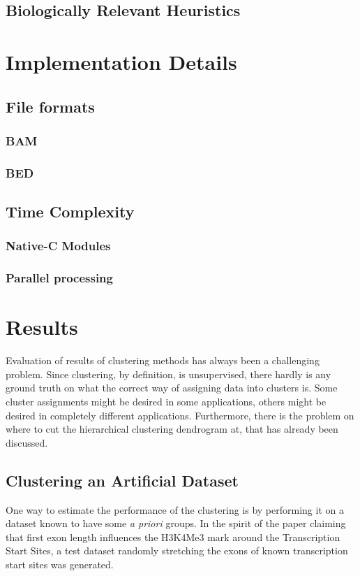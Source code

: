 \documentclass[parskip]{cs4rep}
\begin{document}
\section{Biologically Relevant Heuristics}

\chapter{Implementation Details}

\section{File formats}
\subsection{BAM}
\subsection{BED}
  
\section{Time Complexity}
\subsection{Native-C Modules}
\subsection{Parallel processing}

\chapter{Results}
Evaluation of results of clustering methods has always been a challenging problem. Since clustering, by definition, is unsupervised, there hardly is any ground truth on what the correct way of assigning data into clusters is. Some cluster assignments might be desired in some applications, others might be desired in completely different applications. Furthermore, there is the problem on where to cut the hierarchical clustering dendrogram at, that has already been discussed.

\section{Clustering an Artificial Dataset}
One way to estimate the performance of the clustering is by performing it on a dataset known to have some \emph{a priori} groups. In the spirit of the paper claiming that first exon length influences the H3K4Me3 mark around the Transcription Start Sites\cite{Bieberstein:2012tf}, a test dataset randomly stretching the exons of known transcription start sites was generated.
\end{document}
